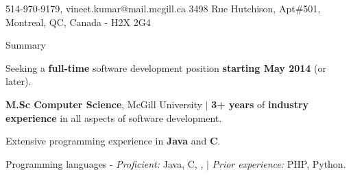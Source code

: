 \documentclass{resume} %
\begin{document}
\begin{hSubsection}{514-970-9179, vineet.kumar@mail.mcgill.ca}
{%
}{3498 Rue Hutchison, Apt\#501, Montreal, QC, Canada - H2X 2G4}
\end{hSubsection}



\begin{rSection}{Summary} \smallskip \begin{lSubsection} 
\item Seeking a \textbf{full-time} software development position
\textbf{starting May 2014} (or later).  
\item \textbf{M.Sc Computer Science}, McGill University $\vert$
\textbf{3+ years} of \textbf{industry experience} in all aspects of software
development.
\item Extensive programming experience in \textbf{Java} and \textbf{C}.
\item Programming languages - \emph{Proficient:} {Java}, {C}, {\xten},
\matlab
$\vert$ \emph{Prior experience:} PHP, Python.
\end{lSubsection}
\end{rSection}

 
\end{document}
